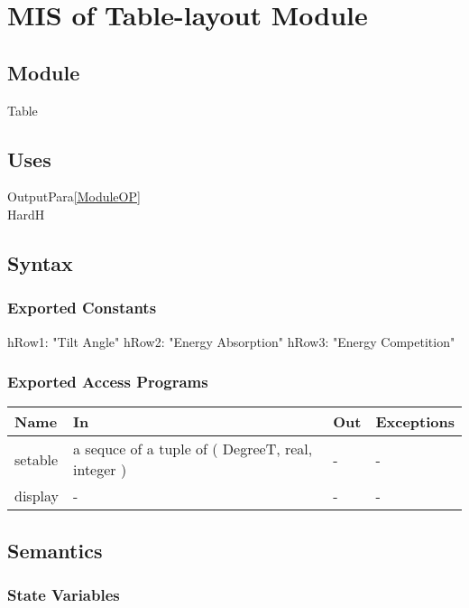 \documentclass[12pt, titlepage]{article}
\begin{document}
\section{MIS of Table-layout Module} \label{ModuleT} 

\subsection{Module}
Table\\

\subsection{Uses}
OutputPara\ref{ModuleOP}\\
HardH\\


\subsection{Syntax}

\subsubsection{Exported Constants}

hRow1: "Tilt Angle"
hRow2: "Energy Absorption"
hRow3: "Energy Competition"

\subsubsection{Exported Access Programs}

\begin{center}
\begin{tabular}{p{2cm} p{5cm} p{5cm} p{2cm}}
\hline
\textbf{Name} & \textbf{In} & \textbf{Out} & \textbf{Exceptions} \\
\hline 
setable & a sequce of a tuple of ( DegreeT, real, integer ) & - & - \\
display & - & - & - \\

\hline
\end{tabular}
\end{center}


\subsection{Semantics}

\subsubsection{State Variables}
\end{document}
